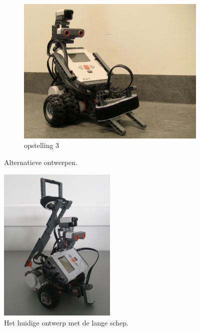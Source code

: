 \documentclass[tt3]{penoverslag}
\begin{document}
\begin{figure}
\begin{subfigure}[h]{0.325\textwidth}
		\centering
		\includegraphics[width=\textwidth]{robotOud3}
		\caption{opstelling 3}
		\label{fig:robotOud3}
	\end{subfigure}
\caption{Alternatieve ontwerpen.}
\label{fig:robotOud}
\end{figure}

\begin{figure}
\centering
	\includegraphics[width=0.5\textwidth]{robotNieuw}
\caption{Het huidige ontwerp met de lange schep.}
\label{fig:robotBouw}
\end{figure}
\end{document}

